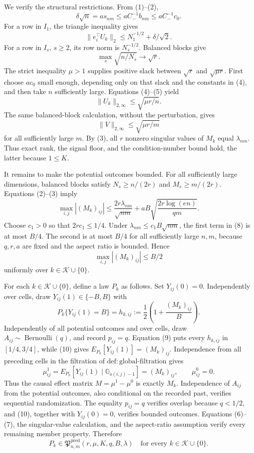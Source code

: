 We verify the structural restrictions.  From (1)--(2),
\[
 \delta\sqrt n=a s_{nm}\le aC_-^{-1}b_{nm}\le aC_-^{-1}c_0.
 \tag{4}
\]
For a row in \(I_1\), the triangle inequality gives
\[
 \lVert e_i^\top U_k\rVert_2
 \le N_1^{-1/2}+\delta/\sqrt2.
 \tag{5}
\]
For a row in \(I_s\), \(s\ge2\), its row norm is \(N_s^{-1/2}\).  Balanced blocks give
\[
 \max_s\sqrt{n/N_s}\longrightarrow\sqrt r.
\]
The strict inequality \(\mu>1\) supplies positive slack between \(\sqrt r\) and \(\sqrt{\mu r}\).  First choose \(a c_0\) small enough, depending only on that slack and the constants in (4), and then take \(n\) sufficiently large.  Equations (4)--(5) yield
\[
 \lVert U_k\rVert_{2,\infty}\le\sqrt{\mu r/n}.
 \tag{6}
\]
The same balanced-block calculation, without the perturbation, gives
\[
 \lVert V\rVert_{2,\infty}\le\sqrt{\mu r/m}
 \tag{7}
\]
for all sufficiently large \(m\).  By (3), all \(r\) nonzero singular values of \(M_k\) equal \(\lambda_{nm}\).  Thus exact rank, the signal floor, and the condition-number bound hold, the latter because \(1\le K\).

It remains to make the potential outcomes bounded.  For all sufficiently large dimensions, balanced blocks satisfy \(N_s\ge n/(2r)\) and \(M_s\ge m/(2r)\).  Equations (2)--(3) imply
\[
 \max_{i,j}|(M_k)_{ij}|
 \le \frac{2r\lambda_{nm}}{\sqrt{nm}}
     +aB\sqrt{\frac{2r\log(en)}{qm}}.
 \tag{8}
\]
Choose \(c_1>0\) so that \(2rc_1\le1/4\).  Under \(\lambda_{nm}\le c_1B\sqrt{nm}\), the first term in (8) is at most \(B/4\).  The second is at most \(B/4\) for all sufficiently large \(n,m\), because \(q,r,a\) are fixed and the aspect ratio is bounded.  Hence
\[
 \max_{i,j}|(M_k)_{ij}|\le B/2
 \tag{9}
\]
uniformly over \(k\in\mathcal K\cup\{0\}\).

For each \(k\in\mathcal K\cup\{0\}\), define a law \(P_k\) as follows.  Set \(Y_{ij}(0)=0\).  Independently over cells, draw \(Y_{ij}(1)\in\{-B,B\}\) with
\[
 P_k\{Y_{ij}(1)=B\}
 =h_{k,ij}:=\frac12\left(1+\frac{(M_k)_{ij}}B\right).
 \tag{10}
\]
Independently of all potential outcomes and over cells, draw \(A_{ij}\sim\operatorname{Bernoulli}(q)\), and record \(p_{ij}=q\).  Equation (9) puts every \(h_{k,ij}\) in \([1/4,3/4]\), while (10) gives \(E_{P_k}[Y_{ij}(1)]=(M_k)_{ij}\).  Independence from all preceding cells in the filtration of \(\mathrm{def:global\mbox{-}filtration}\) gives
\[
 \mu^1_{ij}=E_{P_k}[Y_{ij}(1)\mid\mathbb G_{o(i,j)-1}]=(M_k)_{ij},
 \qquad \mu^0_{ij}=0.
 \tag{11}
\]
Thus the causal effect matrix \(M=\mu^1-\mu^0\) is exactly \(M_k\).  Independence of \(A_{ij}\) from the potential outcomes, also conditional on the recorded past, verifies sequential randomization.  The equality \(p_{ij}=q\) verifies overlap because \(q<1/2\), and (10), together with \(Y_{ij}(0)=0\), verifies bounded outcomes.  Equations (6)--(7), the singular-value calculation, and the aspect-ratio assumption verify every remaining member property.  Therefore
\[
 P_k\in\mathfrak P^{\mathrm{pred}}_{n,m}(r,\mu,K,q,B,\lambda)
 \quad\text{for every }k\in\mathcal K\cup\{0\}.
 \tag{12}
\]

